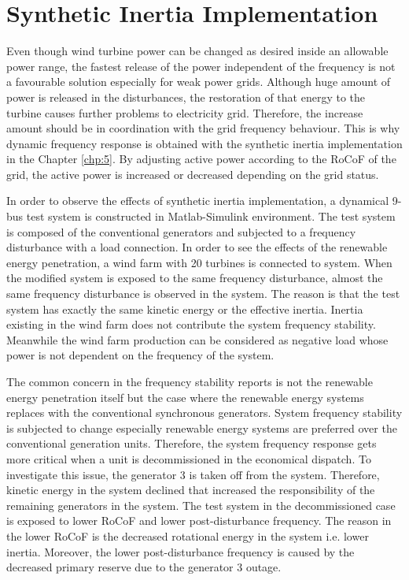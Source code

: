 \section{Synthetic Inertia Implementation}
Even though wind turbine power can be changed as desired inside an allowable power range, the fastest release of the power independent of the frequency is not a favourable solution especially for weak power grids. Although huge amount of power is released in the disturbances, the restoration of that energy to the turbine causes further problems to electricity grid. Therefore, the increase amount should be in coordination with the grid frequency behaviour. This is why dynamic frequency response is obtained with the synthetic inertia implementation in the Chapter \ref{chp:5}. By adjusting active power according to the RoCoF of the grid, the active power is increased or decreased depending on the grid status.\par
In order to observe the effects of synthetic inertia implementation, a dynamical 9-bus test system is constructed in Matlab-Simulink environment. The test system is composed of the conventional generators and subjected to a frequency disturbance with a load connection. In order to see the effects of the renewable energy penetration, a wind farm with 20 turbines is connected to system. When the modified system is exposed to the same frequency disturbance, almost the same frequency disturbance is observed in the system. The reason is that the test system has exactly the same kinetic energy or the effective inertia. Inertia existing in the wind farm does not contribute the system frequency stability. Meanwhile the wind farm production can be considered as negative load whose power is not dependent on the frequency of the system.\par
The common concern in the frequency stability reports is not the renewable energy penetration itself but the case where the renewable energy systems replaces with the conventional synchronous generators. System frequency stability is subjected to change especially renewable energy systems are preferred over the conventional generation units. Therefore, the system frequency response gets more critical when a unit is decommissioned in the economical dispatch. To investigate this issue, the generator 3 is taken off from the system. Therefore, kinetic energy in the system declined that increased the responsibility of the remaining generators in the system. The test system in the decommissioned case is exposed to lower RoCoF and lower post-disturbance frequency.  The reason in the lower RoCoF is the decreased rotational energy in the system i.e. lower inertia. Moreover, the lower post-disturbance frequency is caused by the decreased primary reserve due to the generator 3 outage.\par
